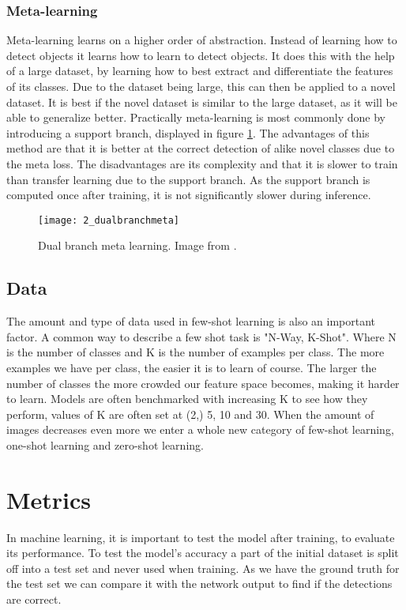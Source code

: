 \subsubsection*{Meta-learning}

Meta-learning learns on a higher order of abstraction. Instead of learning how to detect objects it learns how to learn to detect objects. It does this with the help of a large dataset, by learning how to best extract and differentiate the features of its classes. Due to the dataset being large, this can then be applied to a novel dataset. It is best if the novel dataset is similar to the large dataset, as it will be able to generalize better. Practically meta-learning is most commonly done by introducing a support branch\cite{few-shot-comprehensive-survey}, displayed in figure \ref{fig:2_dualbranchmeta}. The advantages of this method are that it is better at the correct detection of alike novel classes due to the meta loss. The disadvantages are its complexity and that it is slower to train than transfer learning due to the support branch. As the support branch is computed once after training, it is not significantly slower during inference.

\begin{figure}[H]
	\centering
	\texttt{[image: 2\_dualbranchmeta]}
	\caption{\label{fig:2_dualbranchmeta} Dual branch meta learning. Image from \citet{few-shot-comprehensive-survey}.}
\end{figure}

\subsection{Data}

The amount and type of data used in few-shot learning is also an important factor. A common way to describe a few shot task is "N-Way, K-Shot". Where N is the number of classes and K is the number of examples per class. The more examples we have per class, the easier it is to learn of course. The larger the number of classes the more crowded our feature space becomes, making it harder to learn. Models are often benchmarked with increasing K to see how they perform, values of K are often set at (2,) 5, 10 and 30. When the amount of images decreases even more we enter a whole new category of few-shot learning, one-shot learning and zero-shot learning.

\section{Metrics}
In machine learning, it is important to test the model after training, to evaluate its performance. To test the model's accuracy a part of the initial dataset is split off into a test set and never used when training. As we have the ground truth for the test set we can compare it with the network output to find if the detections are correct. 

